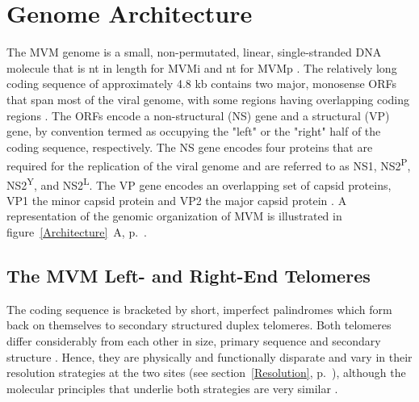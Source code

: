 
\chapter{Genome Architecture} %

\label{Chapter5} %





\label{sec: Architecture}
The MVM genome is a small, non-permutated, linear, single-stranded DNA molecule \cite{pmid789912, pmid225040, Genome1, Genome2} that is  nt in length for MVMi and  nt for MVMp \cite{pmid3502703}. The relatively long coding sequence of approximately 4.8 kb contains two major, monosense ORFs that span most of the viral genome, with some regions having overlapping coding regions \cite{pmid6298737}. The ORFs encode a non-structural (NS) gene and a structural (VP) gene, by convention termed as occupying the "left" or the "right" half of the coding sequence, respectively. The NS gene encodes four proteins that are required for the replication of the viral genome and are referred to as NS1, NS2\textsuperscript{P}, NS2\textsuperscript{Y}, and NS2\textsuperscript{L}. The VP gene encodes an overlapping set of capsid proteins, VP1 the minor capsid protein and VP2 the major capsid protein \cite{pmid6828378, pmid2939261, pmid2942705}. A representation of the genomic organization of MVM is illustrated in figure~\ref{Architecture}~A, p.~\pageref{Architecture}.   

\section{The MVM Left- and Right-End Telomeres}        

The coding sequence is bracketed by short, imperfect palindromes which form back on themselves to secondary structured duplex telomeres. Both telomeres differ considerably from each other in size, primary sequence and secondary structure \cite{pmid6298737}. Hence, they are physically and functionally disparate and vary in their resolution strategies at the two sites (see section~\ref{Resolution}, p.~\pageref{Resolution}), although the molecular principles that underlie both strategies are very similar \cite{encapsidation}. 

